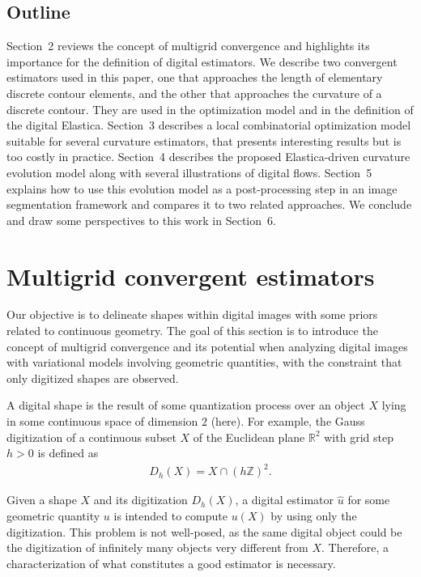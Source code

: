 \documentclass[smallextended]{svjour3}       %
\begin{document}
\subsection{Outline}
Section~2 reviews the concept of multigrid convergence and highlights
its importance for the definition of digital estimators. We describe
two convergent estimators used in this paper, one that approaches the
length of elementary discrete contour elements, and the other that
approaches the curvature of a discrete contour. They are used in the
optimization model and in the definition of the digital
Elastica. Section~3 describes a local combinatorial optimization model
suitable for several curvature estimators, that presents interesting
results but is too costly in practice. Section~4 describes the
proposed Elastica-driven curvature evolution model along with several
illustrations of digital flows. Section~5 explains how to use this
evolution model as a post-processing step in an image segmentation
framework and compares it to two related approaches. We conclude and
draw some perspectives to this work in Section~6.



\section{Multigrid convergent estimators}
Our objective is to delineate shapes within digital images with some priors related to continuous geometry. The goal of
this section is to introduce the concept of multigrid convergence and its potential when analyzing digital images with
variational models involving geometric quantities, with the constraint that only digitized shapes are observed.


A digital shape is the result of some quantization process over an
object $X$ lying in some continuous space of dimension $2$ (here).
For example, the Gauss digitization of a continuous subset $X$ of the
Euclidean plane $\mathbb{R}^2$ with grid step $h>0$ is defined as
\begin{align*}
	D_h(X) = X \cap (h\mathbb{Z})^2.
\end{align*} 

Given a shape $X$ and its digitization $D_h(X)$, a digital estimator $\hat{u}$ for some geometric quantity $u$ is
intended to compute $u(X)$ by using only the digitization. This problem is not well-posed, as the same digital object
could be the digitization of infinitely many objects very different from $X$. Therefore, a characterization of what constitutes
a good estimator is necessary.
\end{document}

